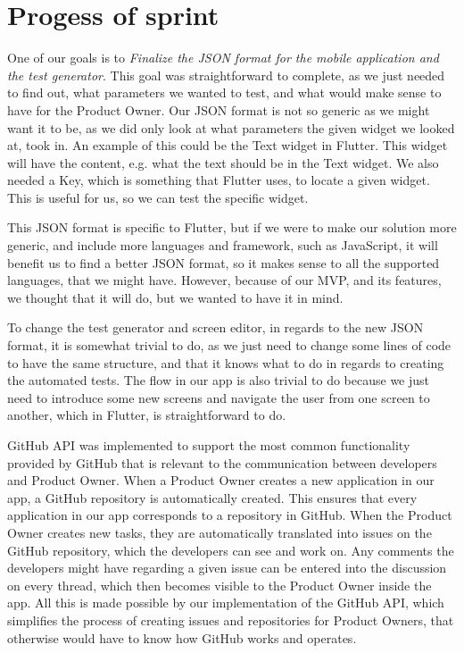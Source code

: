 \section{Progess of sprint}

One of our goals is to \textit{Finalize the JSON format for the mobile application and the test generator}.
This goal was straightforward to complete, as we just needed to find out, what parameters we wanted to test, and what would make sense to have for the Product Owner.
Our JSON format is not so generic as we might want it to be, as we did only look at what parameters the given widget we looked at, took in.
An example of this could be the Text widget in Flutter.
This widget will have the content, e.g. what the text should be in the Text widget.
We also needed a Key, which is something that Flutter uses, to locate a given widget. 
This is useful for us, so we can test the specific widget.

This JSON format is specific to Flutter, but if we were to make our solution more generic, and include more languages and framework, such as JavaScript, it will benefit us to find a better JSON format, so it makes sense to all the supported languages, that we might have.
However, because of our MVP, and its features, we thought that it will do, but we wanted to have it in mind.

To change the test generator and screen editor, in regards to the new JSON format, it is somewhat trivial to do, as we just need to change some lines of code to have the same structure, and that it knows what to do in regards to creating the automated tests.
The flow in our app is also trivial to do because we just need to introduce some new screens and navigate the user from one screen to another, which in Flutter, is straightforward to do.

GitHub API was implemented to support the most common functionality provided by GitHub that is relevant to the communication between developers and Product Owner.
When a Product Owner creates a new application in our app, a GitHub repository is automatically created.
This ensures that every application in our app corresponds to a repository in GitHub. 
When the Product Owner creates new tasks, they are automatically translated into issues on the GitHub repository, which the developers can see and work on. 
Any comments the developers might have regarding a given issue can be entered into the discussion on every thread, which then becomes visible to the Product Owner inside the app.
All this is made possible by our implementation of the GitHub API, which simplifies the process of creating issues and repositories for Product Owners, that otherwise would have to know how GitHub works and operates.